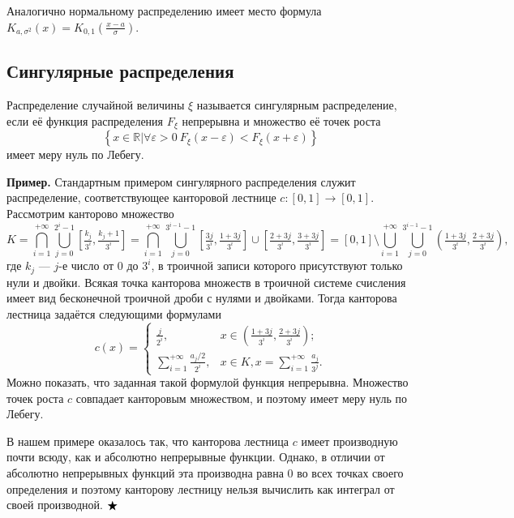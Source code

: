 \documentclass[12pt]{article}
\numberwithin{theorem}{section}
\theoremstyle{definition}
\newenvironment{example}{\indent \textbf{Пример.}}{$ \hfill \bigstar $}
\newcommand{\defin}[2]{\hypertarget{#2}{{\color{red} #1}}}
\newcommand{\RR}{\mathbb{R}}
\newcommand{\defineset}[2]{\left\{
	\left.
	#1
	\right\vert
	#2
	\right\}}
\begin{document}
	Аналогично нормальному распределению имеет место формула
	$ K_{a,\sigma^2}(x) = K_{0, 1}(\tfrac{x - a}{\sigma}) $.
	
	\subsection{Сингулярные распределения}
	
	Распределение случайной величины $ \xi $ называется \defin{сингулярным распределение}{singular-distribution},
	если её функция распределения $ F_\xi $ непрерывна и множество её точек роста 
	$$ \defineset{x \in \RR}{\forall \varepsilon > 0 \ F_\xi(x - \varepsilon) < F_\xi(x + \varepsilon)} $$
	имеет меру нуль по Лебегу.
	
	\begin{example}
		Стандартным примером сингулярного распределения служит распределение, соответствующее канторовой лестнице 
		$ c \colon [0, 1] \to [0, 1] $.
		Рассмотрим канторово множество 
		$$ K = \bigcap\limits_{i = 1}^{+\infty} 
		\bigcup\limits_{j = 0}^{2^i - 1} \left[\tfrac{k_j}{3^i}, \tfrac{k_j + 1}{3^i}\right]
		= \bigcap\limits_{i = 1}^{+\infty} 
		\bigcup\limits_{j = 0}^{3^{i - 1} - 1} 
		\left[\tfrac{3j}{3^i}, \tfrac{1 + 3j}{3^i}\right] \cup \left[\tfrac{2 + 3j}{3^i}, \tfrac{3 + 3j}{3^i}\right]
		= [0, 1] \setminus \bigcup\limits_{i = 1}^{+\infty} 
		\bigcup\limits_{j = 0}^{3^{i - 1} - 1} \left(\tfrac{1 + 3j}{3^i}, \tfrac{2 + 3j}{3^i}\right), $$ 
		где $ k_j $ --- $ j $-е число от $ 0 $ до $ 3^i $, в троичной записи которого присутствуют только нули и двойки.
		Всякая точка канторова множеств в троичной системе
		счисления имеет вид бесконечной троичной дроби с нулями и двойками.
		Тогда канторова лестница задаётся следующими формулами
		$$ c(x)
		=
		\begin{cases}
			\tfrac{j}{2^i}, & x \in \left(\tfrac{1 + 3j}{3^i}, \tfrac{2 + 3j}{3^i}\right); \\
			\sum\limits_{i = 1}^{+\infty} \tfrac{a_j / 2}{2^i}, & x \in K, x = \sum\limits_{i = 1}^{+\infty} \tfrac{a_j}{3^j}.
		\end{cases} $$
		Можно показать, что заданная такой формулой функция непрерывна. 
		Множество точек роста $ c $ совпадает канторовым множеством,
		и поэтому имеет меру нуль по Лебегу.
		
		В нашем примере оказалось так, что канторова лестница $ c $ имеет производную почти всюду, 
		как и абсолютно непрерывные функции. Однако, в отличии от абсолютно непрерывных функций
		эта производна равна 0 во всех точках своего определения и поэтому канторову лестницу нельзя вычислить 
		как интеграл от своей производной.		
	\end{example}
	
\end{document}
